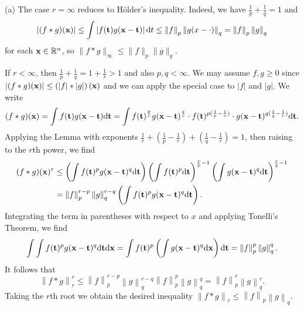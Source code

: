 \begin{exercise}{9.2}
  (a) The case $r = \infty$ reduces to H\"{o}lder's inequality.
  Indeed, we have $\frac{1}{p} + \frac{1}{q} = 1$ and
  \[
    \left| (f * g)(\mathbf{x}) \right| \le \int \left| f(\mathbf{t}) g(\mathbf{x}-\mathbf{t}) \right| \mathrm{d} t
    \le \left\| f \right\|_p \left\| g(x-\cdot) \right\|_q
    = \left\| f \right\|_p \left\| g \right\|_q
  \]
  for each $\mathbf{x} \in \mathbb{R}^n$, so $\| f*g \|_{\infty} \le \|f\|_p \|g\|_q$.

  If $r < \infty$,
  then $\frac{1}{p} + \frac{1}{q} = 1 + \frac{1}{r} > 1$
  and also $p, q < \infty$.
  We may assume $f, g \ge 0$ since
  $\left| (f*g)(\mathbf{x}) \right| \le \left( |f|*|g| \right) (\mathbf{x})$
  and we can apply the special case to $|f|$ and $|g|$.
  We write
  \[
    (f*g)(\mathbf{x}) = \int f(\mathbf{t}) g(\mathbf{x}-\mathbf{t}) \mathrm{d} \mathbf{t}
    = \int f(\mathbf{t})^{\frac{p}{r}} g(\mathbf{x}-\mathbf{t})^{\frac{q}{r}}
    \cdot f(\mathbf{t})^{p(\frac1p - \frac1r)}
    \cdot g(\mathbf{x} - \mathbf{t})^{q(\frac1q - \frac1r)} \mathrm{d} \mathbf{t}.
  \]
  Applying the Lemma
  with exponents
  $\frac{1}{r} + (\frac{1}{p} - \frac{1}{r})
  + (\frac{1}{q} - \frac{1}{r}) = 1$,
  then raising to the $r$th power,
  we find
  \[
    \begin{aligned}
    (f*g)(\mathbf{x})^r
    &\le
    \left( \int f(\mathbf{t})^p g(\mathbf{x}-\mathbf{t})^q \mathrm{d} \mathbf{t} \right)
    \left( \int f(\mathbf{t})^p \mathrm{d} \mathbf{t} \right)^{\frac rp - 1}
    \left( \int g(\mathbf{x}-\mathbf{t})^q \mathrm{d} \mathbf{t} \right)^{\frac rq - 1} \\
    &= \left\| f \right\|_p^{r-p} \left\| g \right\|_{q}^{r-q}
      \left( \int f(\mathbf{t})^p g(\mathbf{x}-\mathbf{t})^q \mathrm{d} \mathbf{t} \right).
    \end{aligned}
  \]
  Integrating the term in parentheses with respect to $x$
  and applying Tonelli's Theorem, we find
  \[
    \int \int f(\mathbf{t})^p g(\mathbf{x}-\mathbf{t})^q \mathrm{d} \mathbf{t} \mathrm{d} \mathbf{x}
    = \int f(\mathbf{t})^p \left( \int g(\mathbf{x}-\mathbf{t})^q \mathrm{d} \mathbf{x} \right) \mathrm{d} \mathbf{t}
    = \left\| f \right\|_p^p \left\| g \right\|_q^q.
  \]
  It follows that
  \[
    \left\| f*g \right\|_r^r \le
    \left\| f \right\|_p^{r-p} \left\| g \right\|_{q}^{r-q}
    \left\| f \right\|_p^p \left\| g \right\|_q^q
    = \left\| f \right\|_p^r \left\| g \right\|_q^r.
  \]
  Taking the $r$th root we obtain the desired inequality
  $\left\| f*g \right\|_r \le \left\| f \right\|_p \left\| g \right\|_q$.


\end{exercise}
